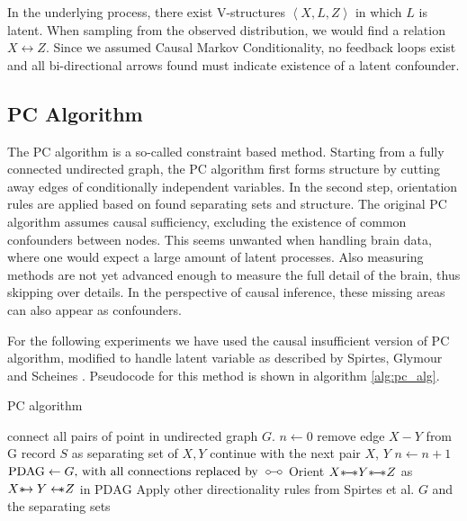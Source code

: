 \documentclass[a4paper, 10pt, english, onecolumn]{article}
\def \oline {\circ\hspace{-0.38em}-\hspace{-0.2em}\circ}
\def \srightarrow {\text{\textasteriskcentered}\hspace{-0.62em}\rightarrow}
\def \sleftarrow {\leftarrow\hspace{-0.62em}\text{\textasteriskcentered}}
\def \sline {\text{\textasteriskcentered}\hspace{-0.38em}-\hspace{-0.4em}\text{\textasteriskcentered}}
\begin{document}
In the underlying process, there exist V-structures $\left <X,L,Z \right>$ in which $L$ is latent.
When sampling from the observed distribution, we would find a relation $X \leftrightarrow Z$.
Since we assumed Causal Markov Conditionality, no feedback loops exist and all bi-directional arrows found must indicate existence of a latent confounder.

\subsection{PC Algorithm}
The PC algorithm is a so-called constraint based method.
Starting from a fully connected undirected graph, the PC algorithm first forms structure by cutting away edges of conditionally independent variables.
In the second step, orientation rules are applied based on found separating sets and structure.
The original PC algorithm assumes causal sufficiency, excluding the existence of common confounders between nodes.
This seems unwanted when handling brain data, where one would expect a large amount of latent processes.
Also measuring methods are not yet advanced enough to measure the full detail of the brain, thus skipping over details.
In the perspective of causal inference, these missing areas can also appear as confounders.

For the following experiments we have used the causal insufficient version of PC algorithm, modified to handle latent variable as described by Spirtes, Glymour and Scheines \cite[p.165-167]{spirtes2000}.
Pseudocode for this method is shown in algorithm \ref{alg:pc_alg}.

\begin{algorithm}
\caption{PC algorithm}
\begin{spacing}{1.1}
\begin{algorithmic}
\State connect all pairs of point in undirected graph $G$.
\State $n \gets 0$
        \State remove edge $X - Y$ from G
        \State record $S$ as separating set of $X, Y$
        \State continue with the next pair $X$, $Y$
      \EndIf
    \EndFor
  \EndFor
  \State $n \gets n+1$
\EndWhile
\State $\text{PDAG} \gets G\text{, with all connections replaced by }\oline$
    \State Orient $X \sline Y \sline Z$ as $X \srightarrow Y \sleftarrow Z$ in $\text{PDAG}$
  \EndIf
\EndFor
\State Apply other directionality rules from Spirtes et al. \cite[p.165-167]{spirtes2000}
\State \Return $G$ and the separating sets
\EndFunction
\end{algorithmic}
\end{spacing}
\label{alg:pc_alg}
\end{algorithm}
\end{document}
